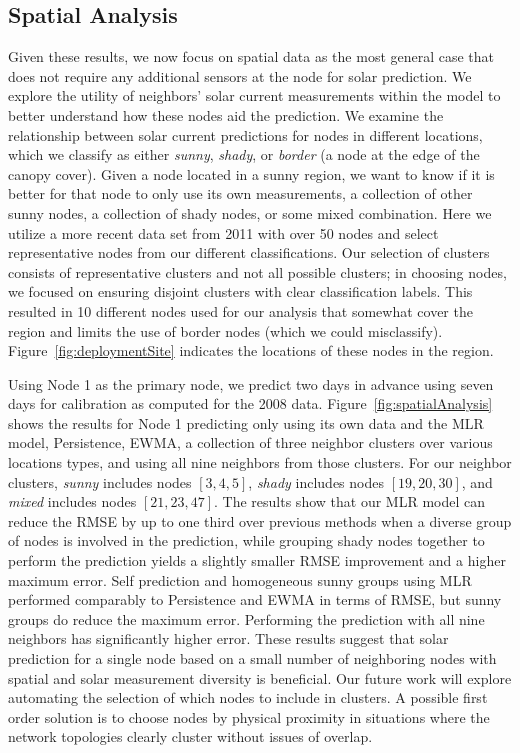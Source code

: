 \documentclass[prodmode,acmtosn]{acmsmall}
\begin{document}
\subsection{Spatial Analysis}
Given these results,  we now focus on spatial data as the most general case that does not require any additional sensors at the node for solar prediction. We explore the utility of neighbors' solar current measurements within the model to better understand how these nodes aid the prediction.
We examine the relationship between solar current predictions for nodes in different locations, which we classify as either {\it sunny}, {\it shady}, or {\it border} (a node at the edge of the canopy cover).
Given a node located in a sunny region, we want to know if it is better for that node to only use its own measurements, a collection of other sunny nodes, a collection of shady nodes, or some  mixed combination.
Here we utilize a more recent data set from 2011 with over 50 nodes and select representative nodes from our different classifications.
Our selection of clusters consists of representative clusters and not all possible clusters; in choosing nodes, we focused on ensuring disjoint clusters with clear classification labels.
This resulted in 10 different nodes used for our analysis that somewhat cover the region and limits the use of border nodes (which we could misclassify).
Figure~\ref{fig:deploymentSite} indicates the locations of these nodes in the region.

Using Node 1 as the primary node, we predict two days in advance using seven days for calibration as computed for the 2008 data.
Figure~\ref{fig:spatialAnalysis} shows the results for Node 1 predicting only using its own data and the MLR model, Persistence, EWMA, a collection of three neighbor clusters over various locations types, and using all nine neighbors from those clusters.
For our neighbor clusters, {\it sunny} includes nodes $[3, 4, 5]$, {\it shady} includes nodes $[19, 20, 30]$, and {\it mixed} includes nodes $[21, 23, 47]$.
 The results show that our MLR model can reduce the RMSE by up to one third over previous methods when a diverse group of nodes is involved in the prediction, while grouping shady nodes
 together to perform the prediction yields  a slightly smaller RMSE improvement and a higher maximum error. Self prediction and homogeneous sunny groups using MLR performed comparably to Persistence and EWMA in terms of RMSE, but sunny groups do reduce the maximum error.    Performing the prediction with all nine neighbors  has significantly higher  error. These results suggest that solar prediction  for a single node based on a small number of  neighboring nodes with spatial and solar measurement diversity is beneficial.
Our future work will explore automating the selection of which nodes to include in clusters.
A possible first order solution is to choose nodes by physical proximity in situations where the network topologies clearly cluster without issues of overlap.
 
\end{document}
